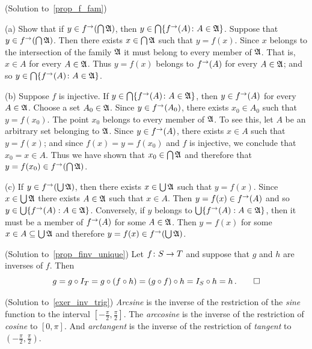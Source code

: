 \begin{prf}\label{sol_prop_f_fam}(Solution to~\ref{prop_f_fam})

(a) Show that if $y \in f^{\rightarrow}(\bigcap \mathfrak{A})$, then $y \in \bigcap\{f^{\rightarrow}(A)
\colon A \in \mathfrak{A}\}$.  Suppose that $y \in f^{\rightarrow}(\bigcap \mathfrak{A})$. Then there
exists $x \in \bigcap\mathfrak{A}$ such that $y = f(x)$. Since $x$ belongs to the intersection
of the family $\mathfrak{A}$ it must belong to every member of $\mathfrak{A}$. That is, $x \in A$
for every $A \in \mathfrak{A}$. Thus $y = f(x)$ belongs to $f^{\rightarrow}(A)$ for every $A \in
\mathfrak{A}$; and so $y \in \bigcap\{f^{\rightarrow}(A)\colon A \in \mathfrak{A}\}$.

(b) Suppose $f$ is injective. If $y \in \bigcap\{f^{\rightarrow}(A)\colon A \in \mathfrak{A}\}$, then
$y \in f^{\rightarrow}(A)$ for every $A \in \mathfrak{A}$. Choose a set $A_0 \in \mathfrak{A}$. Since $y
\in f^{\rightarrow}(A_0)$, there exists $x_0 \in A_0$ such that $y = f(x_0)$. The point $x_0$
belongs to every member of $\mathfrak{A}$. To see this, let $A$ be an arbitrary set belonging
to $\mathfrak{A}$. Since $y \in f^{\rightarrow}(A)$, there exists $x \in A$ such that $y = f(x)$; and
since $f(x) = y = f(x_0)$ and $f$ is injective, we conclude that $x_0 = x \in A$. Thus we
have shown that $x_0 \in \bigcap\mathfrak{A}$ and therefore that $y = f(x_0) \in
f^{\rightarrow}(\bigcap\mathfrak{A})$.

(c) If $y \in f^{\rightarrow}(\bigcup\mathfrak{A})$, then there exists $x \in \bigcup\mathfrak{A}$ such
that $y = f(x)$. Since $x \in \bigcup\mathfrak{A}$ there exists $A \in \mathfrak{A}$ such that $x
\in A$. Then $y = f(x) \in f^{\rightarrow}(A)$ and so $y \in \bigcup\{f^{\rightarrow}(A): A \in \mathfrak{A}\}$. Conversely, if $y$ belongs to $\bigcup\{f^{\rightarrow}(A): A \in \mathfrak{A}\}$, then it must
be a member of $f^{\rightarrow}(A)$ for some $A \in \mathfrak{A}$. Then $y = f(x)$ for some $x \in A
\subseteq \bigcup\mathfrak{A}$ and therefore $y = f(x) \in f^{\rightarrow}(\bigcup\mathfrak{A})$. \qedhere
\end{prf}



\begin{prf}\label{sol_prop_finv_unique}(Solution to~\ref{prop_finv_unique})
Let $f\colon S \rightarrow T$ and suppose that $g$ and $h$ are inverses of $f$. Then
  \[ g = g \circ I_T = g \circ (f \circ h) = (g \circ f) \circ h = I_S
                 \circ h = h\,.\qedhere \]
\end{prf}

\begin{prf}\label{sol_exer_inv_trig}(Solution to~\ref{exer_inv_trig})
\emph{Arcsine} is the inverse of the restriction of the \emph{sine} function to the interval
$[-\frac\pi2,\frac\pi2]$.  The \emph{arccosine} is the inverse of the restriction of
\emph{cosine} to $[0,\pi]$.  And \emph{arctangent} is the inverse of the restriction of
\emph{tangent} to $(-\frac\pi2,\frac\pi2)$.
\end{prf}

